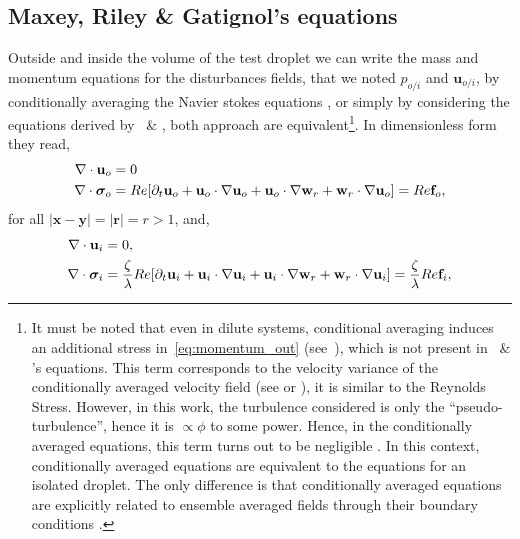 \subsection{Maxey, Riley \& Gatignol's equations}

Outside and inside the volume of the test droplet we can write the mass and momentum equations for the disturbances fields, that we noted $p_{o/i}$ and $\textbf{u}_{o/i}$, by conditionally averaging the Navier stokes equations \citep{koch1993hydrodynamic,fintzi2025}, or simply by considering the equations derived by~\cite{maxey1983equation} \& \citet{gatignol1983faxen}, both approach are equivalent\footnote{
    It must be noted that even in dilute systems, conditional averaging induces an additional stress in~\ref{eq:momentum_out} (see~\cite[Eq. (9)]{koch1993hydrodynamic}), which is not present in~\cite{maxey1983equation} \& \citet{gatignol1983faxen}'s equations. 
    This term corresponds to the velocity variance of the conditionally averaged velocity field (see \citet{koch1993hydrodynamic} or \citet[Chapter 4]{fintzi2025}), it is similar to the Reynolds Stress. 
    However, in this work, the turbulence considered is only the ``pseudo-turbulence'', hence it is $\propto \phi$ to some power. 
    Hence, in the conditionally averaged equations, this term turns out to be negligible \citep[Appendix A]{koch1993hydrodynamic}.
    In this context, conditionally averaged equations are equivalent to the equations for an isolated droplet. 
    The only difference is that conditionally averaged equations are explicitly related to ensemble averaged fields through their boundary conditions \citep{fintzi2025}. 
}. 
In dimensionless form they read, 
\begin{align}
    \div \textbf{u}_{o} &= 0
    \\
    \div\bm\sigma_{o}
    &= 
    Re [
    \pddt \textbf{u}_{o}
    + \textbf{u}_{o}\cdot \grad \textbf{u}_{o}
    + \textbf{u}_{o}\cdot \grad \textbf{w}_r
    + \textbf{w}_r \cdot \grad \textbf{u}_{o}]
    = Re \textbf{f}_{o},
    \label{eq:momentum_out}
\end{align}
for all $|\textbf{x}- \textbf{y}| = |\textbf{r}| = r > 1$, and, 
\begin{align}
    \div \textbf{u}_{i} &= 0,
    \\
    \div\bm\sigma_{i}
    &= 
    \frac{\zeta}{\lambda}Re [
    \pddt \textbf{u}_{i}
    + \textbf{u}_{i}\cdot \grad \textbf{u}_{i}
    + \textbf{u}_{i}\cdot \grad \textbf{w}_r 
    + \textbf{w}_r \cdot \grad \textbf{u}_{i}]
    = \frac{\zeta}{\lambda}Re \textbf{f}_{i},
    \label{eq:momentum_in}
\end{align}
